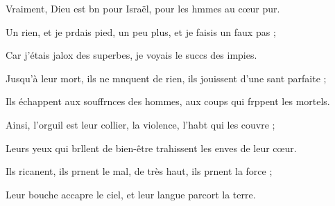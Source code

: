 \item Vraiment, Dieu est bn pour Israël,\psstar{} pour les hmmes au cœur pur.
\item Un rien, et je prdais pied,\psstar{} un peu plus, et je faisis un faux pas ;
\item Car j’étais jalox des superbes,\psstar{} je voyais le succs des impies.
\item Jusqu’à leur mort, ils ne mnquent de rien,\psstar{} ils jouissent d’une sant parfaite ;
\item Ils échappent aux souffrnces des hommes,\psstar{} aux coups qui frppent les mortels.
\item Ainsi, l’orguil est leur collier,\psstar{} la violence, l’habt qui les couvre ;
\item Leurs yeux qui brllent de bien-être\psstar{} trahissent les enves de leur cœur.
\item Ils ricanent, ils prnent le mal,\psstar{} de très haut, ils prnent la force ;
\item Leur bouche accapre le ciel,\psstar{} et leur langue parcort la terre.